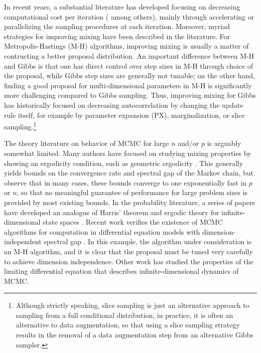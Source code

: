 \documentclass[10pt]{article}
\begin{document}
In recent years, a substantial literature has developed focusing on decreasing computational cost per iteration (\cite{minsker2014robust,srivastava2015wasp,conrad2015accelerating} among others), mainly through accelerating or parallelizing the sampling procedures at each iteration. Moreover, myriad strategies for improving mixing have been described in the literature. For Metropolis-Hastings (M-H) algorithms, improving mixing is usually a matter of contructing a better proposal distribution. An important difference between M-H and Gibbs is that one has direct control over step sizes in M-H through choice of the proposal, while Gibbs step sizes are generally not tunable; on the other hand, finding a good proposal for multi-dimensional parameters in M-H is significantly more challenging compared to Gibbs sampling. Thus, improving mixing for Gibbs has historically focused on decreasing autocorrelation by changing the update rule itself, for example by parameter expansion (PX), marginalization, or slice sampling.\footnote{Although strictly speaking, slice sampling is just an alternative approach to sampling from a full conditional distribution, in practice, it is often an alternative to data augmentation, so that using a slice sampling strategy results in the removal of a data augmentation step from an alternative Gibbs sampler.} 

The theory literature on behavior of MCMC for large $n$ and/or $p$ is arguably somewhat limited. Many authors have focused on studying mixing properties by showing 
an ergodicity condition, such as geometric ergodicity \citep{roberts2004general,meyn2012markov}. This generally yields bounds on the convergence rate and spectral gap of the Markov chain, but \cite{rajaratnam2015mcmc} observe that in many cases, these bounds converge to one exponentially fast in $p$ or $n$, so that no meaningful guarantee of performance for large problem sizes is provided by most existing bounds. In the probability literature, a series of papers have developed an analogue of Harris' theorem and ergodic theory for infinite-dimensional state spaces \citep{hairer2011asymptotic}. Recent work verifies the existence of MCMC algorithms for computation in differential equation models with dimension-independent spectral gap \citep{hairer2014spectral}. In this example, the algorithm under consideration is an M-H algorithm, and it is clear that the proposal must be tuned very carefully to achieve dimension independence. Other work has studied the properties of the limiting differential equation that describes infinite-dimensional dynamics of MCMC.
\end{document}
